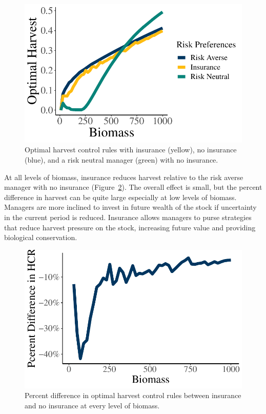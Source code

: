 \documentclass[
  letterpaper,
  DIV=11,
  numbers=noendperiod]{scrartcl}
\begin{document}
\begin{figure}

{\centering \includegraphics{docs_files/figure-pdf/fig-hcr-1.pdf}

}

\caption{\label{fig-hcr}Optimal harvest control rules with insurance
(yellow), no insurance (blue), and a risk neutral manager (green) with
no insurance.}

\end{figure}

At all levels of biomass, insurance reduces harvest relative to the risk
averse manager with no insurance (Figure~\ref{fig-pct}). The overall
effect is small, but the percent difference in harvest can be quite
large especially at low levels of biomass. Managers are more inclined to
invest in future wealth of the stock if uncertainty in the current
period is reduced. Insurance allows managers to purse strategies that
reduce harvest pressure on the stock, increasing future value and
providing biological conservation.

\begin{figure}

{\centering \includegraphics{docs_files/figure-pdf/fig-pct-1.pdf}

}

\caption{\label{fig-pct}Percent difference in optimal harvest control
rules between insurance and no insurance at every level of biomass.}

\end{figure}
\end{document}
